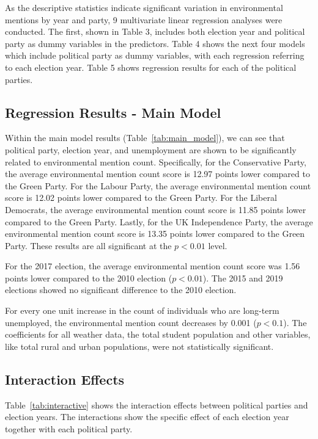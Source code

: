 \documentclass[12pt,letterpaper]{article}
\begin{document}
As the descriptive statistics indicate significant variation in environmental mentions by year and party, 9 multivariate linear regression analyses were conducted. The first, shown in Table 3, includes both election year and political party as dummy variables in the predictors. Table 4 shows the next four models which include political party as dummy variables, with each regression referring to each election year. Table 5 shows regression results for each of the political parties.

\subsection{Regression Results - Main Model}


Within the main model results (Table~\ref{tab:main_model}), we can see that political party, election year, and unemployment are shown to be significantly related to environmental mention count. Specifically, for the Conservative Party, the average environmental mention count score is 12.97 points lower compared to the Green Party. For the Labour Party, the average environmental mention count score is 12.02 points lower compared to the Green Party. For the Liberal Democrats, the average environmental mention count score is 11.85 points lower compared to the Green Party. Lastly, for the UK Independence Party, the average environmental mention count score is 13.35 points lower compared to the Green Party. These results are all significant at the $p<0.01$ level.

For the 2017 election, the average environmental mention count score was 1.56 points lower compared to the 2010 election ($p<0.01$). The 2015 and 2019 elections showed no significant difference to the 2010 election. 

For every one unit increase in the count of individuals who are long-term unemployed, the environmental mention count decreases by 0.001 ($p<0.1$). The coefficients for all weather data, the total student population and other variables, like total rural and urban populations, were not statistically significant.


\subsection{Interaction Effects}

Table~\ref{tab:interactive} shows the interaction effects between political parties and election years. The interactions show the specific effect of each election year together with each political party. 
\end{document}
